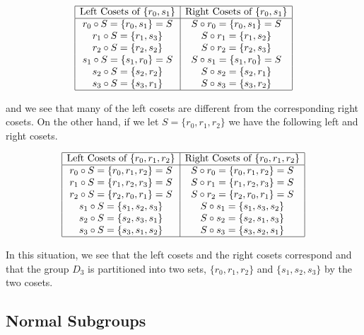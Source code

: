 \documentclass[
]{book}
\theoremstyle{definition}
\theoremstyle{definition}
\theoremstyle{definition}
\theoremstyle{definition}
\theoremstyle{remark}
\begin{document}
\[\begin{array}{|c|c|}
    \hline
    \mbox{Left Cosets of } \{r_0, s_1\} & \mbox{Right Cosets  of } \{r_0, s_1\}\\ \hline
    r_0 \circ S = \{r_0, s_1\} = S & S \circ r_0 = \{r_0, s_1\} = S \\
     r_1 \circ S = \{r_1, s_3\}  & S \circ r_1 = \{r_1, s_2\}  \\
     r_2 \circ S = \{r_2, s_2 \} & S \circ r_2 = \{r_2, s_3 \} \\
     s_1 \circ S = \{s_1, r_0\}=S & S \circ s_1 = \{s_1, r_0\} = S \\
     s_2 \circ S = \{s_2, r_2 \} & S \circ s_2 = \{s_2, r_1\}  \\
     s_3 \circ S = \{s_3, r_1\} & S \circ s_3 = \{s_3, r_2\}  \\ \hline
\end{array}\]

and we see that many of the left cosets are different from the corresponding right cosets. On the other hand, if we let \(S=\{r_0, r_1, r_2\}\) we have the following left and right cosets.

\[\begin{array}{|c|c|}
    \hline
    \mbox{Left Cosets of } \{r_0, r_1, r_2\} & \mbox{Right Cosets of } \{r_0, r_1, r_2\}\\ \hline
    r_0 \circ S = \{r_0, r_1, r_2\} = S & S \circ r_0 = \{r_0, r_1, r_2\} = S \\
     r_1 \circ S = \{r_1, r_2, r_3 \} = S & S \circ r_1 = \{r_1, r_2, r_3\} =S \\
     r_2 \circ S = \{r_2, r_0, r_1 \}=S & S \circ r_2 = \{r_2, r_0, r_1 \}=S \\
     s_1 \circ S = \{s_1, s_2, s_3\} & S \circ s_1 = \{s_1, s_3, s_2\} \\
     s_2 \circ S = \{s_2, s_3, s_1 \} & S \circ s_2 = \{s_2, s_1, s_3\}  \\
     s_3 \circ S = \{s_3, s_1, s_2 \} & S \circ s_3 = \{s_3, s_2, s_1 \}  \\ \hline
\end{array}\]

In this situation, we see that the left cosets and the right cosets correspond and that the group \(D_3\) is partitioned into two sets, \(\{r_0, r_1, r_2\}\) and \(\{s_1, s_2, s_3\}\) by the two cosets.

\hypertarget{normal-subgroups}{%
\subsection{Normal Subgroups}\label{normal-subgroups}}
\end{document}
